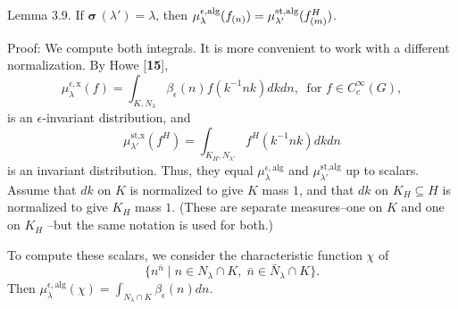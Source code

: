 \proclaim Lemma {3.9}.
If
   $\pmb\sigma \, (\lambda') = \lambda $,
then
  $ \mu_{\lambda}^{\epsilon, \text{{\rm alg}} }
      (f_{(n)}) =
    \mu_{\lambda'}^{\text{{\rm st,alg}}}
      (f^H_{(m)})$.
\finishproclaim

\pproclaim Proof:
We compute both integrals.
It is more convenient to work with a different normalization.
By Howe [{\bf 15}],
%
$$
  \mu_{\lambda}^{\epsilon,\text{x}}
  (f) =
  \int_{ K, N_{\lambda} }
  \beta_{\epsilon} (n) 
  f (k^{-1}nk) dkdn, \ \text{ for }
  f \in 
  C_c^{\infty} (G),
$$
%
is an $\epsilon$-invariant distribution, and
%
$$
  \mu_{\lambda'}^{\text{st,x}} (f^H) =
  \int_{K_H,N_{\lambda'}}
  f^H
  (k^{-1}nk)
  dkdn 
$$
%
is an invariant distribution.
Thus, they equal
  $ \mu_{\lambda}^{\epsilon, \text{alg}}$ and
    $\mu_{\lambda'}^{\text{st,alg}} $
up to scalars.
Assume that $dk$ on $K$ is normalized to give $K$ mass $1$, and
that $dk$ on
  $ K_H \subseteq H $
is normalized to give 
  $ K_H $
mass $1$.
(These are separate measures--one on $K$ and one on
  $ K_H $
--but the same notation is used for both.)

To compute these scalars, we consider the characteristic function $\chi$
 of 
%
$$
   \{
      n^{\bar n} \mid
      n \in N_{\lambda} \cap K, \;
      \bar n \in \bar N_{\lambda} \cap K 
    \}.
$$
%
Then 
  $ \mu_{\lambda}^{\epsilon,\text{alg}}
    (\chi) =
    \int_{ N_{\lambda}\cap K }
    \beta_{\epsilon} (n) d n $.

